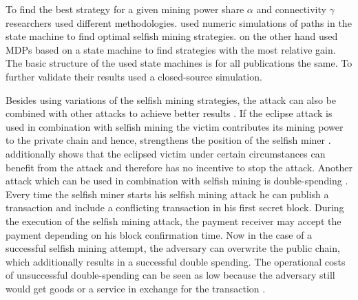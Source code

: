 \documentclass{scrartcl}
\begin{document}
To find the best strategy for a given mining power share $\alpha$ and connectivity $\gamma$ researchers used different methodologies.
\cite{gervais2015tampering, nayak2016stubborn} used numeric simulations of paths in the state machine to find optimal selfish mining strategies.
\cite{sapirshtein2016optimal, gervais2016security} on the other hand used MDPs based on a state machine to find strategies with the most relative gain.
The basic structure of the used state machines is for all publications the same.
To further validate their results \cite{eyal2014majority, sapirshtein2016optimal} used a closed-source simulation.

Besides using variations of the selfish mining strategies, the attack can also be combined with other attacks to achieve better results \cite{gervais2016security, sapirshtein2016optimal, nayak2016stubborn, gervais2015tampering}.
If the eclipse attack is used in combination with selfish mining the victim contributes its mining power to the private chain and hence, strengthens the position of the selfish miner \cite{nayak2016stubborn, gervais2016security}.
\cite{nayak2016stubborn} additionally shows that the eclipsed victim under certain circumstances can benefit from the attack and therefore has no incentive to stop the attack.
Another attack which can be used in combination with selfish mining is double-spending \cite{sapirshtein2016optimal, gervais2016security}.
Every time the selfish miner starts his selfish mining attack he can publish a transaction and include a conflicting transaction in his first secret block.
During the execution of the selfish mining attack, the payment receiver may accept the payment depending on his block confirmation time.
Now in the case of a successful selfish mining attempt, the adversary can overwrite the public chain, which additionally results in a successful double spending.
The operational costs of unsuccessful double-spending can be seen as low because the adversary still would get goods or a service in exchange for the transaction \cite{sapirshtein2016optimal, gervais2016security}.
\end{document}
